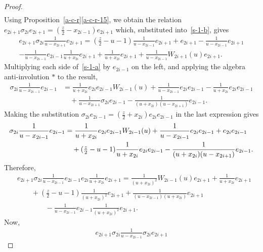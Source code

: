 \documentclass[11pt,a4paper,reqno,svgnames]{amsart}
\theoremstyle{plain}
\theoremstyle{definition}
\numberwithin{equation}{section}
\begin{document}
\begin{proof}
\begin{equation}
\begin{split}
\end{split}
\end{equation}
Using Proposition~\ref{a-c-r}\eqref{a-c-r-15}, we obtain the relation $e_{2i+1}\sigma_{2i}e_{2i+1}=(\frac{z}{2}-x_{2i-1})e_{2i+1}$ which, substituted into~\eqref{s-1-b}, gives 
\begin{multline}
e_{2i+1}\sigma_{2i}\frac{1}{u-x_{2i+1}}e_{2i+1}
=({\textstyle\frac{z}{2}}-u-1)\frac{1}{u-x_{2i-1}}e_{2i+1}+e_{2i+1}-\frac{1}{u-x_{2i-1}}e_{2i+1}\\
-\frac{1}{u-x_{2i-1}}e_{2i-1}\frac{1}{u+x_{2i}}e_{2i+1}
+\frac{1}{u+x_{2i}}e_{2i+1}
+\frac{1}{u-x_{2i-1}}{W_{2i+1}(u)}e_{2i+1}.\label{s-1-c}
\end{multline}
Multiplying each side of~\eqref{s-1-a} by $e_{2i-1}$ on the left, and applying the algebra anti-involution $*$ to the result,
\begin{align*}
\sigma_{2i}\frac{1}{u-x_{2i-1}}e_{2i-1}
&=\frac{1}{u+x_{2i}}e_{2i}e_{2i-1}W_{2i-1}(u)
+\frac{1}{u-x_{2i-1}}e_{2i}e_{2i-1}-\frac{1}{u+x_{2i}}e_{2i}e_{2i-1}\\
&\quad+\frac{1}{u-x_{2i+1}}\sigma_{2i}e_{2i-1}
-\frac{1}{(u+x_{2i})(u-x_{2i+1})}e_{2i-1}.
\end{align*}
Making the substitution $\sigma_{2i}e_{2i-1}=(\frac{z}{2}+x_{2i})e_{2i}e_{2i-1}$ in the last expression gives
\begin{align*}
\sigma_{2i}\frac{1}{u-x_{2i-1}}e_{2i-1}
&=\frac{1}{u+x_{2i}}e_{2i}e_{2i-1}W_{2i-1}(u)
+\frac{1}{u-x_{2i-1}}e_{2i}e_{2i-1}+e_{2i}e_{2i-1}\\
&\quad+({\textstyle\frac{z}{2}}-u-1)\frac{1}{u+x_{2i}}e_{2i}e_{2i-1}
-\frac{1}{(u+x_{2i})(u-x_{2i+1})}e_{2i-1}.\notag
\end{align*}
Therefore, 
\begin{equation}
\begin{split}\label{s-1-d}
&e_{2i+1}\sigma_{2i}\frac{1}{u-x_{2i-1}}e_{2i-1}e_{2i}\frac{1}{u+x_{2i}}e_{2i+1}=\frac{1}{(u+x_{2i})^2}W_{2i-1}(u)e_{2i+1}
+\frac{1}{u+x_{2i}}e_{2i+1}\\
&\qquad+({\textstyle\frac{z}{2}}-u-1)\frac{1}{(u+x_{2i})^2}e_{2i+1}
+\frac{1}{(u-x_{2i-1})(u+x_{2i})}e_{2i+1}\\
&\qquad\qquad-\frac{1}{u-x_{2i-1}}e_{2i-1}\frac{1}{(u+x_{2i})^2}e_{2i+1}.
\end{split}
\end{equation}
Now, 
\begin{equation}\label{s-1-e}
\begin{split}
e_{2i+1}\sigma_{2i}\frac{1}{u-x_{2i-1}}\sigma_{2i}e_{2i+1}

\end{split}
\end{equation}
\end{proof}
\end{document}

